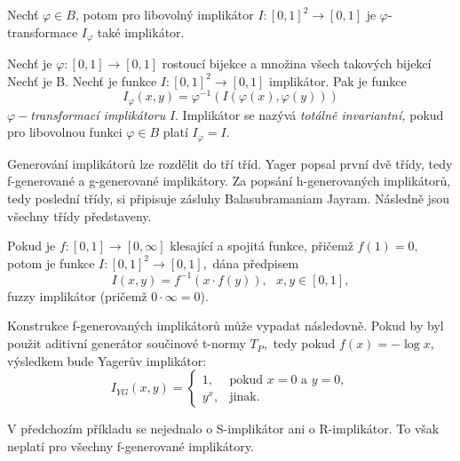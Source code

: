 \begin{sentence}\cite{Springer}
    Nech\v t $\varphi \in B$, potom pro libovolný implikátor $I: [0,1]^2 \rightarrow [0,1]$ je $\varphi$-transformace $I_\varphi$ také implikátor.
\end{sentence}

\begin{definition}\cite{Springer}
    Nech\v t je $\varphi:[0,1] \rightarrow [0,1]$  rostoucí
    bijekce a množina všech takových bijekcí Nech\v t je B. Nech\v t je funkce
    $I:[0,1]^2\rightarrow [0,1]$ 
    implikátor.
    Pak je funkce
    $$I_\varphi(x,y)=\varphi^{-1}(I(\varphi (x), \varphi (y)))$$
    $\varphi-${\em transformací implikátoru} $I.$ Implikátor se nazývá
    {\em totálně invariantní,} pokud pro libovolnou funkci $\varphi \in B$ platí $I_\varphi=I.$\\
\end{definition}

Generování implikátor\r u lze rozdělit do tří tříd. Yager popsal první dvě třídy, tedy f-generované a g-generované implikátory. Za popsání  h-generovaných implikátor\r u, tedy poslední třídy, si připisuje zásluhy Balasubramaniam Jayram. Následně jsou všechny třídy představeny.

\begin{sentence}\cite{yager} 
Pokud je $f: [0,1] \to [0,\infty]$ klesající a spojitá funkce,
přičemž $f(1) = 0,$ potom je funkce $I: [0,1]^2 \to [0,1],$ dána předpisem
$$I(x,y) = f^{-1}(x \cdot f(y)), \mbox {   } x, y \in [0,1],$$
fuzzy implikátor (pričemž $0 \cdot \infty = 0$). \\
\end{sentence}

\begin{example}
    \cite{Springer}
    Konstrukce f-generovaných implikátor\r u m\r uže vypadat následovně.
    Pokud by byl použit aditivní generátor součinové t-normy $T_P,$ tedy 
    pokud $f(x) = - \log x,$ výsledkem bude Yager\r uv implikátor:
    $$I_{YG}(x,y)= \begin{cases} 1,
    &\mbox {pokud $x=0$ a $y=0,$} \\
    y^x, &\mbox {jinak.}
    \end{cases}$$
\end{example}
\begin{remark}
    V předchozím příkladu se nejednalo o S-implikátor ani o R-implikátor. To však neplatí pro všechny f-generované implikátory.
\end{remark}


